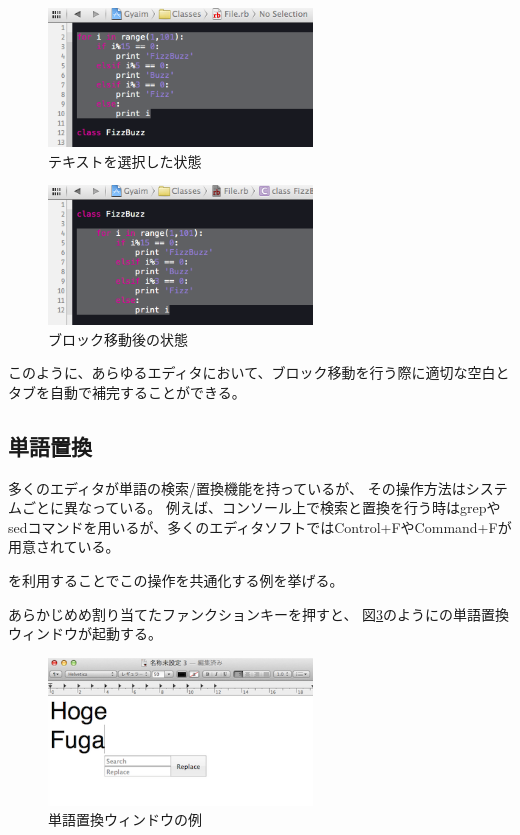 \begin{figure}[H]
\centerline{\includegraphics[width=70mm,bb=0 0 360 190]{figures/indent2.png}}
\caption{テキストを選択した状態}
\label{indent2}
\end{figure}

\begin{figure}[H]
\centerline{\includegraphics[width=70mm,bb=0 0 360 190]{figures/indent3.png}}
\caption{ブロック移動後の状態}
\label{indent3}
\end{figure}

このように、あらゆるエディタにおいて、ブロック移動を行う際に適切な空白とタブを自動で補完することができる。

\subsection{単語置換}

多くのエディタが単語の検索/置換機能を持っているが、
その操作方法はシステムごとに異なっている。
例えば、コンソール上で検索と置換を行う時はgrepやsedコマンドを用いるが、多くのエディタソフトではControl+FやCommand+Fが用意されている。

{\system}を利用することでこの操作を共通化する例を挙げる。

あらかじめめ割り当てたファンクションキーを押すと、
図\ref{search1}のように{\system}の単語置換ウィンドウが起動する。

\begin{figure}[H]
\centerline{\includegraphics[width=70mm,bb=0 0 360 215]{figures/replace1.png}}
\caption{単語置換ウィンドウの例}
\label{search1}
\end{figure}

